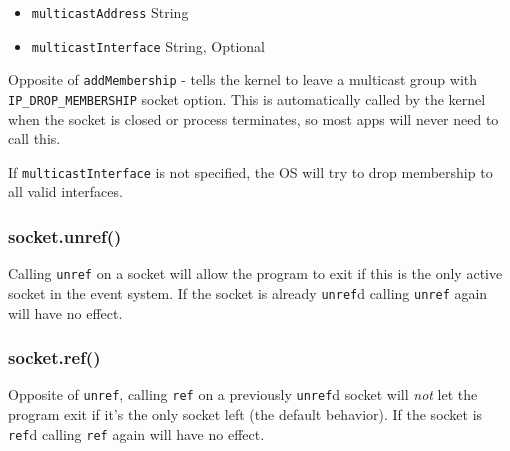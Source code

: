 \begin{itemize}
\item
  \texttt{multicastAddress} String
\item
  \texttt{multicastInterface} String, Optional
\end{itemize}

Opposite of \texttt{addMembership} - tells the kernel to leave a
multicast group with \texttt{IP\_DROP\_MEMBERSHIP} socket option. This
is automatically called by the kernel when the socket is closed or
process terminates, so most apps will never need to call this.

If \texttt{multicastInterface} is not specified, the OS will try to drop
membership to all valid interfaces.

\subsubsection{socket.unref()}

Calling \texttt{unref} on a socket will allow the program to exit if
this is the only active socket in the event system. If the socket is
already \texttt{unref}d calling \texttt{unref} again will have no
effect.

\subsubsection{socket.ref()}

Opposite of \texttt{unref}, calling \texttt{ref} on a previously
\texttt{unref}d socket will \emph{not} let the program exit if it's the
only socket left (the default behavior). If the socket is \texttt{ref}d
calling \texttt{ref} again will have no effect.
